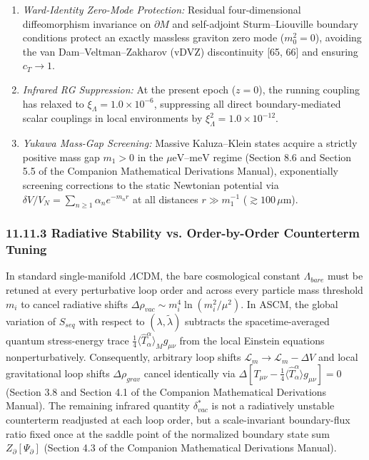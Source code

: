 \documentclass[aps,prd,onecolumn,superscriptaddress,nofootinbib,longbibliography,10pt]{revtex4-2}
\begin{document}
  
\begin{enumerate}
    
\item \textit{Ward-Identity Zero-Mode Protection:} Residual four-dimensional diffeomorphism invariance on \(\partial M\) and self-adjoint Sturm–Liouville boundary conditions protect an exactly massless graviton zero mode (\(m_0^2 = 0\)), avoiding the van Dam–Veltman–Zakharov (vDVZ) discontinuity [65, 66] and ensuring \(c_T \to 1\).
    
\item \textit{Infrared RG Suppression:} At the present epoch (\(z = 0\)), the running coupling has relaxed to \(\xi_\Lambda = 1.0 \times 10^{-6}\), suppressing all direct boundary-mediated scalar couplings in local environments by \(\xi_\Lambda^2 = 1.0 \times 10^{-12}\).
    
\item \textit{Yukawa Mass-Gap Screening:} Massive Kaluza–Klein states acquire a strictly positive mass gap \(m_1 > 0\) in the \(\mu\text{eV}\)–\(\text{meV}\) regime (Section 8.6 and Section 5.5 of the Companion Mathematical Derivations Manual), exponentially screening corrections to the static Newtonian potential via \(\delta V/V_N = \sum_{n\ge 1} \alpha_n e^{-m_n r}\) at all distances \(r \gg m_1^{-1}\) (\(\gtrsim 100\,\mu\text{m}\)).
  
\end{enumerate}

  
\subsubsection*{11.11.3 Radiative Stability vs. Order-by-Order Counterterm Tuning}

  In standard single-manifold $\Lambda$CDM, the bare cosmological constant \(\Lambda_{bare}\) must be retuned at every perturbative loop order and across every particle mass threshold \(m_i\) to cancel radiative shifts \(\Delta\rho_{vac} \sim m_i^4 \ln(m_i^2/\mu^2)\). In ASCM, the global variation of \(S_{seq}\) with respect to \((\lambda, \tilde{\lambda})\) subtracts the spacetime-averaged quantum stress-energy trace \(\frac{1}{4}\langle \hat{T}^\alpha_\alpha \rangle_M g_{\mu\nu}\) from the local Einstein equations nonperturbatively. Consequently, arbitrary loop shifts \(\mathcal{L}_m \to \mathcal{L}_m - \Delta V\) and local gravitational loop shifts \(\Delta\rho_{grav}\) cancel identically via \(\Delta[T_{\mu\nu} - \frac{1}{4}\langle \hat{T}^\alpha_\alpha \rangle g_{\mu\nu}] = 0\) (Section 3.8 and Section 4.1 of the Companion Mathematical Derivations Manual). The remaining infrared quantity \(\delta_{vac}^*\) is not a radiatively unstable counterterm readjusted at each loop order, but a scale-invariant boundary-flux ratio fixed once at the saddle point of the normalized boundary state sum \(Z_\partial[\Psi_\partial]\) (Section 4.3 of the Companion Mathematical Derivations Manual).
\end{document}
